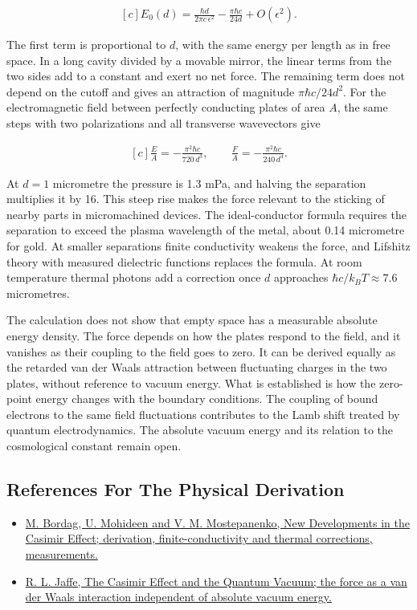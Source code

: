 \documentclass[11pt,oneside]{book}
\newenvironment{centeredalign}{\[\begin{gathered}[c]}{\end{gathered}\]}
\begin{document}
\begin{centeredalign}
E_0(d)=\frac{\hbar d}{2\pi c\,\epsilon^2}-\frac{\pi\hbar c}{24d}+O(\epsilon^2).
\end{centeredalign}

The first term is proportional to \(d\), with the same energy per length as in free space. In a long cavity divided by a movable mirror, the linear terms from the two sides add to a constant and exert no net force. The remaining term does not depend on the cutoff and gives an attraction of magnitude \(\pi\hbar c/24d^2\). For the electromagnetic field between perfectly conducting plates of area \(A\), the same steps with two polarizations and all transverse wavevectors give

\begin{centeredalign}
\frac{E}{A}=-\frac{\pi^2\hbar c}{720\,d^3},\qquad \frac{F}{A}=-\frac{\pi^2\hbar c}{240\,d^4}.
\end{centeredalign}

At \(d=1\) micrometre the pressure is 1.3 mPa, and halving the separation multiplies it by 16. This steep rise makes the force relevant to the sticking of nearby parts in micromachined devices. The ideal-conductor formula requires the separation to exceed the plasma wavelength of the metal, about 0.14 micrometre for gold. At smaller separations finite conductivity weakens the force, and Lifshitz theory with measured dielectric functions replaces the formula. At room temperature thermal photons add a correction once \(d\) approaches \(\hbar c/k_BT\approx7.6\) micrometres.

The calculation does not show that empty space has a measurable absolute energy density. The force depends on how the plates respond to the field, and it vanishes as their coupling to the field goes to zero. It can be derived equally as the retarded van der Waals attraction between fluctuating charges in the two plates, without reference to vacuum energy. What is established is how the zero-point energy changes with the boundary conditions. The coupling of bound electrons to the same field fluctuations contributes to the Lamb shift treated by quantum electrodynamics. The absolute vacuum energy and its relation to the cosmological constant remain open.

\subsection*{References For The Physical Derivation}
\begin{itemize}
\item \href{https://arxiv.org/abs/quant-ph/0106045}{M. Bordag, U. Mohideen and V. M. Mostepanenko, New Developments in the Casimir Effect; derivation, finite-conductivity and thermal corrections, measurements.}
\item \href{https://arxiv.org/abs/hep-th/0503158}{R. L. Jaffe, The Casimir Effect and the Quantum Vacuum; the force as a van der Waals interaction independent of absolute vacuum energy.}
\end{itemize}
\end{document}

